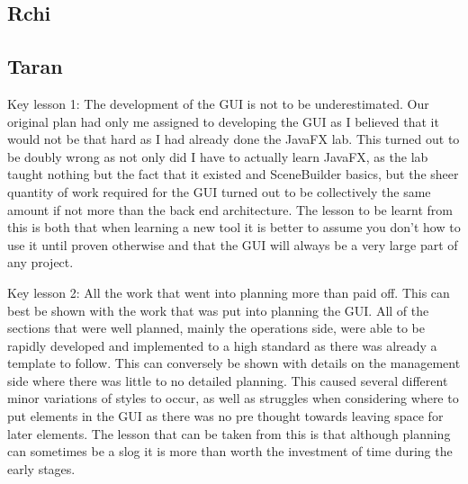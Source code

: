 \subsection{Rchi}

\subsection{Taran}
Key lesson 1:
The development of the GUI is not to be underestimated. Our original plan had only me assigned to developing the GUI as I believed that it would not be that hard as I had already done the JavaFX lab. This turned out to be doubly wrong as not only did I have to actually learn JavaFX, as the lab taught nothing but the fact that it existed and SceneBuilder basics, but the sheer quantity of work required for the GUI turned out to be collectively the same amount if not more than the back end architecture.
The lesson to be learnt from this is both that when learning a new tool it is better to assume you don't how to use it until proven otherwise and that the GUI will always be a very large part of any project.

Key lesson 2:
All the work that went into planning more than paid off. This can best be shown with the work that was put into planning the GUI. All of the sections that were well planned, mainly the operations side, were able to be rapidly developed and implemented to a high standard as there was already a template to follow. This can conversely be shown with details on the management side where there was little to no detailed planning. This caused several different minor variations of styles to occur, as well as struggles when considering where to put elements in the GUI as there was no pre thought towards leaving space for later elements.
The lesson that can be taken from this is that although planning can sometimes be a slog it is  more than worth the investment of time during the early stages.
